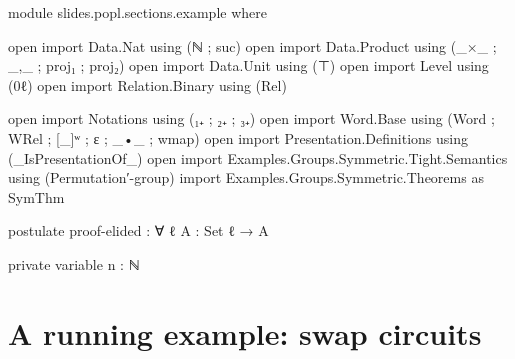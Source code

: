 \begin{code}[hide]
module slides.popl.sections.example where

open import Data.Nat using (ℕ ; suc)
open import Data.Product using (_×_ ; _,_ ; proj₁ ; proj₂)
open import Data.Unit using (⊤)
open import Level using (0ℓ)
open import Relation.Binary using (Rel)

open import Notations using (₁₊ ; ₂₊ ; ₃₊)
open import Word.Base using (Word ; WRel ; [_]ʷ ; ε ; _•_ ; wmap)
open import Presentation.Definitions using (_IsPresentationOf_)
open import Examples.Groups.Symmetric.Tight.Semantics using (Permutation′-group)
import Examples.Groups.Symmetric.Theorems as SymThm

postulate
  proof-elided : ∀ {ℓ} {A : Set ℓ} → A

private variable
  n : ℕ
\end{code}
\section{A running example: swap circuits}

